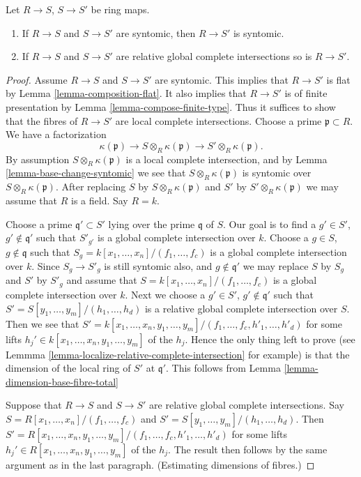 \begin{lemma}
\label{lemma-composition-syntomic}
Let $R \to S$, $S \to S'$ be ring maps.
\begin{enumerate}
\item If $R \to S$ and $S \to S'$ are syntomic, then $R \to S'$
is syntomic.
\item If $R \to S$ and $S \to S'$ are relative global complete intersections
so is $R \to S'$.
\end{enumerate}
\end{lemma}

\begin{proof}
Assume $R \to S$ and $S \to S'$ are syntomic.
This implies that $R \to S'$ is flat by
Lemma \ref{lemma-composition-flat}.
It also implies that $R \to S'$ is of finite presentation by
Lemma \ref{lemma-compose-finite-type}.
Thus it suffices to show that the fibres of $R \to S'$ are
local complete intersections. 
Choose a prime $\mathfrak p \subset R$.
We have a factorization
$$
\kappa(\mathfrak p) \to
S \otimes_R \kappa(\mathfrak p) \to
S' \otimes_R \kappa(\mathfrak p).
$$
By assumption $S \otimes_R \kappa(\mathfrak p)$ is
a local complete intersection, and by Lemma \ref{lemma-base-change-syntomic}
we see that $S\otimes_R \kappa(\mathfrak p)$ is syntomic over
$S \otimes_R \kappa(\mathfrak p)$.
After replacing $S$ by $S \otimes_R \kappa(\mathfrak p)$
and $S'$ by $S' \otimes_R \kappa(\mathfrak p)$ we may assume
that $R$ is a field. Say $R = k$.

\medskip\noindent
Choose a prime $\mathfrak q' \subset S'$ lying over the prime
$\mathfrak q$ of $S$. Our goal is to find a $g' \in S'$,
$g' \not \in \mathfrak q'$ such that $S'_{g'}$ is a global complete
intersection over $k$. Choose a $g \in S$, $g \not \in \mathfrak q$
such that $S_g = k[x_1, \ldots, x_n]/(f_1, \ldots, f_c)$ is 
a global complete intersection over $k$.
Since $S_g \to S'_g$ is still syntomic also, and $g \not \in \mathfrak q'$
we may replace $S$ by $S_g$ and $S'$ by $S'_g$ and assume that
$S =  k[x_1, \ldots, x_n]/(f_1, \ldots, f_c)$ is 
a global complete intersection over $k$. Next we choose a $g' \in S'$,
$g' \not \in \mathfrak q'$ such that
$S' = S[y_1, \ldots, y_m]/(h_1, \ldots, h_d)$
is a relative global complete intersection over $S$.
Then we see that
$S' = k[x_1, \ldots, x_n, y_1, \ldots, y_m]/
(f_1, \ldots, f_c, h'_1, \ldots, h'_d)$ for some
lifts $h_j' \in k[x_1, \ldots, x_n, y_1, \ldots, y_m]$ of the $h_j$.
Hence the only thing left to prove
(see Lemmma \ref{lemma-localize-relative-complete-intersection} for example)
is that the dimension of the local ring of $S'$ at $\mathfrak q'$.
This follows from Lemma \ref{lemma-dimension-base-fibre-total}

\medskip\noindent
Suppose that $R \to S$ and $S \to S'$ are
relative global complete intersections. Say
$S =  R[x_1, \ldots, x_n]/(f_1, \ldots, f_c)$
and
$S' = S[y_1, \ldots, y_m]/(h_1, \ldots, h_d)$.
Then 
$S' = R[x_1, \ldots, x_n, y_1, \ldots, y_m]/
(f_1, \ldots, f_c, h'_1, \ldots, h'_d)$ for some
lifts $h_j' \in R[x_1, \ldots, x_n, y_1, \ldots, y_m]$ of the $h_j$.
The result then follows by the same argument as in the last paragraph.
(Estimating dimensions of fibres.)
\end{proof}


